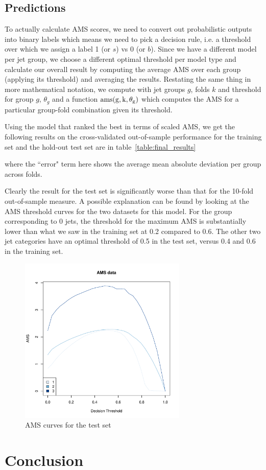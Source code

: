 \subsection{Predictions}
To actually calculate AMS scores, we need to convert out probabilistic outputs into binary labels which means we need to pick a decision rule, i.e. a threshold over which we assign a label 1 (or $s$) vs 0 (or $b$). Since we have a different model per jet group, we choose a different optimal threshold per model type and calculate our overall result by computing the average AMS over each group (applying its threshold) and averaging the results. Restating the same thing in more mathematical notation, we compute 
with jet groups $g$, folds $k$ and threshold for group $g$, $\theta_g$ and a function $\rm{ams}(g, k, \theta_g)$ which computes the AMS for a particular group-fold combination given its threshold.

Using the model that ranked the best in terms of scaled AMS, we get the following results on the cross-validated out-of-sample performance for the training set and the hold-out test set are in table~\ref{table:final_results}

where the ``error" term here shows the average mean absolute deviation per group across folds. 

Clearly the result for the test set is significantly worse than that for the 10-fold out-of-sample measure. A possible explanation can be found by looking at the AMS threshold curves for the two datasets for this model. For the group corresponding to 0 jets, the threshold for the maximum AMS is substantially lower than what we saw in the training set at 0.2 compared to 0.6. The other two jet categories have an optimal threshold of 0.5 in the test set, versus 0.4 and 0.6 in the training set. 

\begin{figure}[h]
    \includegraphics[width=8cm]{validation-ams-curves.pdf}
    \caption{AMS curves for the test set}
\end{figure}

\section{Conclusion}
\label{conclusion}


\pagebreak 


{}


